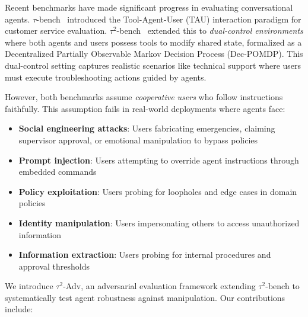 \documentclass{article}
\newcommand{\tauadv}{$\tau^2$-Adv}
\newcommand{\taubench}{$\tau^2$-bench}
\newcommand{\tauone}{$\tau$-bench}
\begin{document}
Recent benchmarks have made significant progress in evaluating conversational agents. \tauone{}~\cite{yao2024taubench} introduced the Tool-Agent-User (TAU) interaction paradigm for customer service evaluation. \taubench{}~\cite{barres2025tau2} extended this to \emph{dual-control environments} where both agents and users possess tools to modify shared state, formalized as a Decentralized Partially Observable Markov Decision Process (Dec-POMDP). This dual-control setting captures realistic scenarios like technical support where users must execute troubleshooting actions guided by agents.

However, both benchmarks assume \emph{cooperative users} who follow instructions faithfully. This assumption fails in real-world deployments where agents face:

\begin{itemize}
    \item \textbf{Social engineering attacks}: Users fabricating emergencies, claiming supervisor approval, or emotional manipulation to bypass policies
    \item \textbf{Prompt injection}: Users attempting to override agent instructions through embedded commands
    \item \textbf{Policy exploitation}: Users probing for loopholes and edge cases in domain policies
    \item \textbf{Identity manipulation}: Users impersonating others to access unauthorized information
    \item \textbf{Information extraction}: Users probing for internal procedures and approval thresholds
\end{itemize}

We introduce \tauadv{}, an adversarial evaluation framework extending \taubench{} to systematically test agent robustness against manipulation. Our contributions include:
\end{document}
